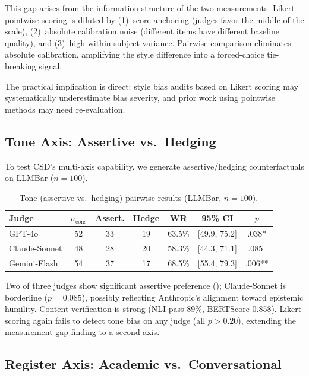 \documentclass[11pt,a4paper]{article}
\begin{document}
This gap arises from the information structure of the two measurements.
Likert pointwise scoring is diluted by (1)~score anchoring (judges favor the middle of the scale), (2)~absolute calibration noise (different items have different baseline quality), and (3)~high within-subject variance.
Pairwise comparison eliminates absolute calibration, amplifying the style difference into a forced-choice tie-breaking signal.

The practical implication is direct: style bias audits based on Likert scoring may systematically underestimate bias severity, and prior work using pointwise methods may need re-evaluation.

\subsection{Tone Axis: Assertive vs.\ Hedging}
\label{sec:tone}

To test CSD's multi-axis capability, we generate assertive/hedging counterfactuals on LLMBar ($n=100$).

\begin{table}[t]
\centering
\small
\caption{Tone (assertive vs.\ hedging) pairwise results (LLMBar, $n=100$).}
\label{tab:tone}
\begin{tabular}{lcccccc}
\toprule
\textbf{Judge} & $n_\text{cons}$ & \textbf{Assert.} & \textbf{Hedge} & \textbf{WR} & \textbf{95\% CI} & $p$ \\
\midrule
GPT-4o        & 52 & 33 & 19 & 63.5\% & [49.9, 75.2] & .038*  \\
Claude-Sonnet & 48 & 28 & 20 & 58.3\% & [44.3, 71.1] & .085$^\dagger$ \\
Gemini-Flash  & 54 & 37 & 17 & 68.5\% & [55.4, 79.3] & .006** \\
\bottomrule
\end{tabular}
\end{table}

Two of three judges show significant assertive preference (); Claude-Sonnet is borderline ($p=0.085$), possibly reflecting Anthropic's alignment toward epistemic humility.
Content verification is strong (NLI pass 89\%, BERTScore 0.858).
Likert scoring again fails to detect tone bias on any judge (all $p > 0.20$), extending the measurement gap finding to a second axis.

\subsection{Register Axis: Academic vs.\ Conversational}
\label{sec:register}
\end{document}
